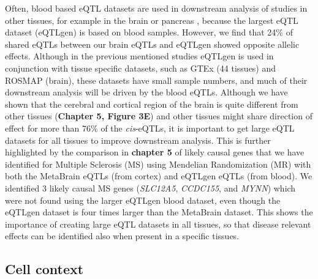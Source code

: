 Often, blood based eQTL datasets are used in downstream analysis of studies in other tissues, for example in the brain\cite{wrayGenomewideAssociationAnalyses2018, qiIdentifyingGeneTargets2018a} or pancreas \cite{keEvaluationPolymorphismsMicroRNA2020,inshawGeneticVariantsPredisposing2020}, because the largest eQTL dataset (eQTLgen\cite{vosaUnravelingPolygenicArchitecture2018}) is based on blood samples. However, we find that 24\% of shared eQTLs between our brain eQTLs and eQTLgen \cite{vosaUnravelingPolygenicArchitecture2018} showed opposite allelic effects. Although in the previous mentioned studies eQTLgen is used in conjunction with tissue specific datasets, such as GTEx\cite{thegtexconsortiumGTExConsortiumAtlas2020} (44 tissues) and ROSMAP (brain), these datasets have small sample numbers, and much of their downstream analysis will be driven by the blood eQTLs. Although we have shown that the cerebral and cortical region of the brain is quite different from other tissues (\textbf{Chapter 5, Figure 3E}) and other tissues might share direction of effect for more than 76\% of the \textit{cis}-eQTLs, it is important to get large eQTL datasets for all tissues to improve downstream analysis. This is further highlighted by the comparison in \textbf{chapter 5} of likely causal genes that we have identified for Multiple Sclerosis (MS) using Mendelian Randomization (MR) with both the MetaBrain eQTLs (from cortex) and eQTLgen eQTLs (from blood). We identified 3 likely causal MS genes (\textit{SLC12A5}, \textit{CCDC155}, and \textit{MYNN}) which were not found using the larger eQTLgen blood dataset, even though the eQTLgen dataset is four times larger than the MetaBrain dataset. This shows the importance of creating large eQTL datasets in all tissues, so that disease relevant effects can be identified also when present in a specific tissues.

\subsection{Cell context}

